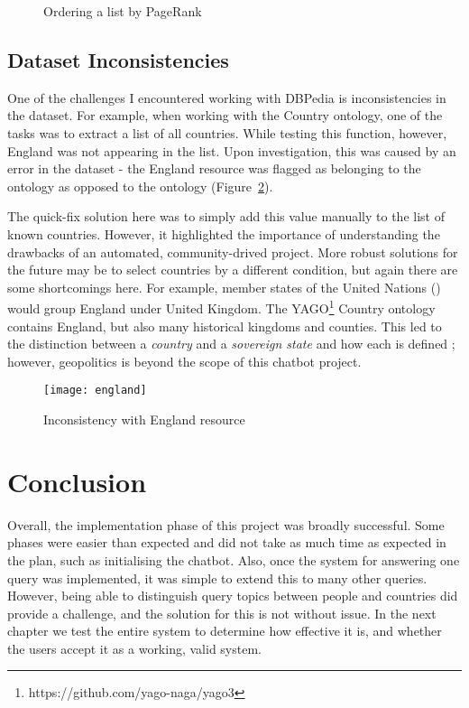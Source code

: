 \begin{figure}[p]
	\centering
	 \qquad
	\caption{Ordering a list by PageRank}
	\label{fig:ranked}
\end{figure}

\subsection{Dataset Inconsistencies}
\label{sec:dataset}
One of the challenges I encountered working with DBPedia is inconsistencies in the dataset. For example, when working with the Country ontology, one of the tasks was to extract a list of all countries. While testing this function, however, England was not appearing in the list. Upon investigation, this was caused by an error in the dataset - the England resource was flagged as belonging to the  ontology as opposed to the  ontology (Figure~\ref{fig:england}).

The quick-fix solution here was to simply add this value manually to the list of known countries. However, it highlighted the importance of understanding the drawbacks of an automated, community-drived project. More robust solutions for the future may be to select countries by a different condition, but again there are some shortcomings here. For example, member states of the United Nations () would group England under United Kingdom. The YAGO\footnote{https://github.com/yago-naga/yago3} Country ontology contains England, but also many historical kingdoms and counties. This led to the distinction between a {\it country} and a {\it sovereign state} and how each is defined \cite{fowler1996}; however, geopolitics is beyond the scope of this chatbot project.

\begin{figure}[p]
	\centering
	\texttt{[image: england]}
	\caption{Inconsistency with England resource}
	\label{fig:england}
\end{figure}

\section{Conclusion}
Overall, the implementation phase of this project was broadly successful. Some phases were easier than expected and did not take as much time as expected in the plan, such as initialising the chatbot. Also, once the system for answering one query was implemented, it was simple to extend this to many other queries. However, being able to distinguish query topics between people and countries did provide a challenge, and the solution for this is not without issue. In the next chapter we test the entire system to determine how effective it is, and whether the users accept it as a working, valid system.

